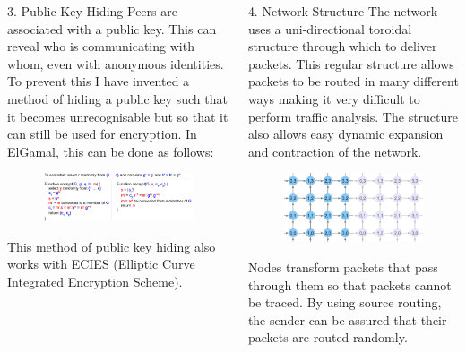 \documentclass[ %
                    author={Luke Murray},
                supervisor={Dr. Simon Hollis},
                     title={Shadow Peer-to-Peer Networks},
                  subtitle={},
                    degree={MEng},
                      year={2013} ]{poster}
\begin{document}
\begin{frame}{}
\begin{columns}[t]
    \begin{column}{0.422\linewidth}
    \begin{block}{\normalsize 3. Public Key Hiding}
    \small Peers are associated with a public key. This can reveal who is communicating with whom, even with anonymous identities. To prevent this I have invented a method of hiding a public key such that it becomes unrecognisable but so that it can still be used for encryption. In ElGamal, this can be done as follows:
    \begin{figure}[h]
        \includegraphics{diagrams/poster_d4.eps}
    \end{figure}    
    This method of public key hiding also works with ECIES (Elliptic Curve Integrated Encryption Scheme).
    \end{block}
    \end{column}
    
    \begin{column}{0.422\linewidth}
    \begin{block}{\normalsize 4. Network Structure}
    \small The network uses a uni-directional toroidal structure through which to deliver packets. This regular structure allows packets to be routed in many different ways making it very difficult to perform traffic analysis. The structure also allows easy dynamic expansion and contraction of the network.
    \begin{figure}[h]
        \includegraphics{diagrams/poster_d1.eps}
    \end{figure}
    Nodes transform packets that pass through them so that packets cannot be traced. By using source routing, the sender can be assured that their packets are routed randomly.
    \end{block}
    \end{column}
\end{columns}

\vfill

\end{frame}

\end{document}

